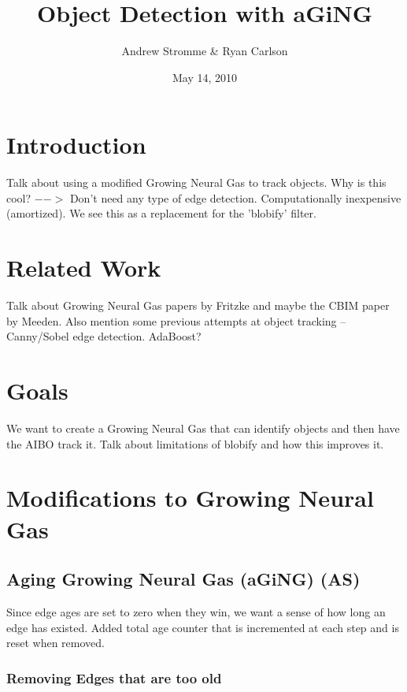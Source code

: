 \documentclass{article}
\renewcommand{\|}{\origbar} %
\begin{document}
\title{Object Detection with aGiNG}
\author{Andrew Stromme \& Ryan Carlson}
\date{May 14, 2010}
\maketitle

\begin{abstract}
\end{abstract}

\section{Introduction}

Talk about using a modified Growing Neural Gas to track objects. Why is this cool? $-->$ Don't need any type of edge detection. Computationally inexpensive (amortized). We see this as a replacement for the 'blobify' filter.

\section{Related Work}

Talk about Growing Neural Gas papers by Fritzke and maybe the CBIM paper by Meeden. Also mention some previous attempts at object tracking -- Canny/Sobel edge detection. AdaBoost?

\section{Goals}

We want to create a Growing Neural Gas that can identify objects and then have the AIBO track it. Talk about limitations of blobify and how this improves it.

\section{Modifications to Growing Neural Gas}

\subsection{Aging Growing Neural Gas (aGiNG) (AS)}

Since edge ages are set to zero when they win, we want a sense of how long an edge has existed. Added total age counter that is incremented at each step and is reset when removed.

\subsubsection{Removing Edges that are too old}
\end{document}
